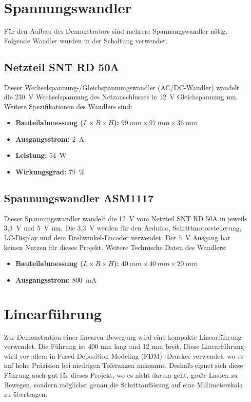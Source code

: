 \section{Spannungswandler}
Für den Aufbau des Demonstrators sind mehrere Spannungswandler nötig. Folgende Wandler wurden in der Schaltung verwendet.
\subsection{Netzteil SNT RD 50A}
Dieser Wechselspannung-/Gleichspannungswandler (AC/DC-Wandler) wandelt die 230\ V Wechselspannung des Netzanschlusses in 12\ V Gleichspannung um. %
Weitere Spezifikationen des Wandlers sind:
\begin{itemize}
	\item \textbf{Bauteilabmessung ($L\times B \times H$):} $99 \ mm \times 97 \ mm \times 36 \ mm$
	\item \textbf{Ausgangsstrom:} 2\ A
	\item \textbf{Leistung:} 54\ W
	\item \textbf{Wirkungsgrad:} 79\ \% 
\end{itemize} 
\cite{Meanwell.2019}

\subsection{Spannungswandler ASM1117}
Dieser Spannungswandler wandelt die 12\ V vom Netzteil SNT RD 50A in jeweils 3,3\ V und 5\ V um. Die 3,3\ V werden für den Arduino, Schrittmotorsteuerung, LC-Display und dem Drehwinkel-Encoder verwendet. Der 5\ V Ausgang hat keinen Nutzen für dieses Projekt. Weitere Technische Daten des Wandlers:
\begin{itemize}
	\item \textbf{Bauteilabmessung ($L\times B \times H$):} $40 \ mm \times 40 \ mm \times 20 \ mm$
	\item \textbf{Ausgangsstrom:} 800\ mA
\end{itemize}
	\cite{AMS}
	
\section{Linearführung}
Zur Demonstration einer linearen Bewegung wird eine kompakte Linearführung verwendet. Die Führung ist 400 mm lang und 12 mm breit. Diese Linearführung wird vor allem in Fused Deposition Modeling (FDM) -Drucker verwendet, wo es auf hohe Präzision bei niedrigen Toleranzen ankommt. Deshalb eignet sich diese Führung auch gut für dieses Projekt, wo es nicht darum geht, große Lasten zu Bewegen, sondern möglichst genau die Schrittauflösung auf eine Millimeterskala zu übertragen.

